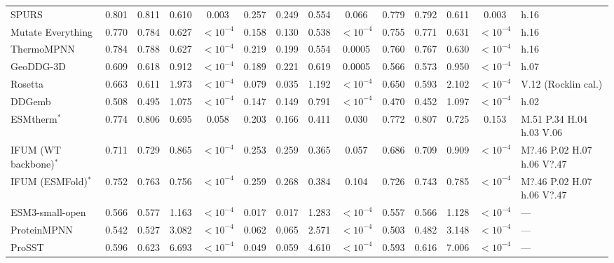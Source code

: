 \begin{table}[H]
{\begin{tabular}{lccccccccccccl}
SPURS & 0.801 & 0.811 & 0.610 & 0.003 & 0.257 & 0.249 & 0.554 & 0.066 & 0.779 & 0.792 & 0.611 & 0.003 & h.16 \\
Mutate Everything & 0.770 & 0.784 & 0.627 & $<10^{-4}$ & 0.158 & 0.130 & 0.538 & $<10^{-4}$ & 0.755 & 0.771 & 0.631 & $<10^{-4}$ & h.16 \\
ThermoMPNN & 0.784 & 0.788 & 0.627 & $<10^{-4}$ & 0.219 & 0.199 & 0.554 & 0.0005 & 0.760 & 0.767 & 0.630 & $<10^{-4}$ & h.16 \\
GeoDDG-3D & 0.609 & 0.618 & 0.912 & $<10^{-4}$ & 0.189 & 0.221 & 0.619 & 0.0005 & 0.566 & 0.573 & 0.950 & $<10^{-4}$ & h.07 \\
Rosetta & 0.663 & 0.611 & 1.973 & $<10^{-4}$ & 0.079 & 0.035 & 1.192 & $<10^{-4}$ & 0.650 & 0.593 & 2.102 & $<10^{-4}$ & V.12 (Rocklin cal.) \\
DDGemb & 0.508 & 0.495 & 1.075 & $<10^{-4}$ & 0.147 & 0.149 & 0.791 & $<10^{-4}$ & 0.470 & 0.452 & 1.097 & $<10^{-4}$ & h.02 \\
ESMtherm$^*$ & 0.774 & 0.806 & 0.695 & 0.058 & 0.203 & 0.166 & 0.411 & 0.030 & 0.772 & 0.807 & 0.725 & 0.153 & M.51 P.34 H.04 h.03 V.06 \\
IFUM (WT backbone)$^*$ & 0.711 & 0.729 & 0.865 & $<10^{-4}$ & 0.253 & 0.259 & 0.365 & 0.057 & 0.686 & 0.709 & 0.909 & $<10^{-4}$ & M?.46 P.02 H.07 h.06 V?.47 \\
IFUM (ESMFold)$^*$ & 0.752 & 0.763 & 0.756 & $<10^{-4}$ & 0.259 & 0.268 & 0.384 & 0.104 & 0.726 & 0.743 & 0.785 & $<10^{-4}$ & M?.46 P.02 H.07 h.06 V?.47 \\
ESM3-small-open & 0.566 & 0.577 & 1.163 & $<10^{-4}$ & 0.017 & 0.017 & 1.283 & $<10^{-4}$ & 0.557 & 0.566 & 1.128 & $<10^{-4}$ & --- \\
ProteinMPNN & 0.542 & 0.527 & 3.082 & $<10^{-4}$ & 0.062 & 0.065 & 2.571 & $<10^{-4}$ & 0.503 & 0.482 & 3.148 & $<10^{-4}$ & --- \\
ProSST & 0.596 & 0.623 & 6.693 & $<10^{-4}$ & 0.049 & 0.059 & 4.610 & $<10^{-4}$ & 0.593 & 0.616 & 7.006 & $<10^{-4}$ & --- \\
\bottomrule
\end{tabular}
}
\end{table}
